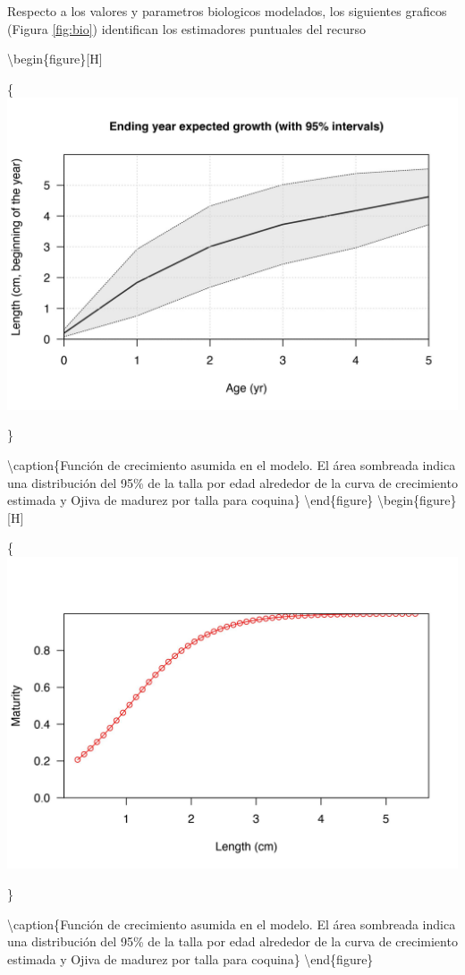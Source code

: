 \documentclass[
]{article}
\begin{document}
Respecto a los valores y parametros biologicos modelados, los siguientes graficos (Figura \ref{fig:bio}) identifican los estimadores puntuales del recurso

\textbackslash begin\{figure\}{[}H{]}

\{\centering \includegraphics[width=0.8\linewidth]{Dtrunculus_SS3_2024_files/figure-latex/bio-1}

\}

\textbackslash caption\{\label{fig:bio}Función de crecimiento asumida en el modelo. El área sombreada indica una distribución del 95\% de la talla por edad alrededor de la curva de crecimiento estimada y Ojiva de madurez por talla para coquina\}\label{fig:bio-1}
\textbackslash end\{figure\}
\textbackslash begin\{figure\}{[}H{]}

\{\centering \includegraphics[width=0.8\linewidth]{Dtrunculus_SS3_2024_files/figure-latex/bio-2}

\}

\textbackslash caption\{\label{fig:bio}Función de crecimiento asumida en el modelo. El área sombreada indica una distribución del 95\% de la talla por edad alrededor de la curva de crecimiento estimada y Ojiva de madurez por talla para coquina\}\label{fig:bio-2}
\textbackslash end\{figure\}
\end{document}
